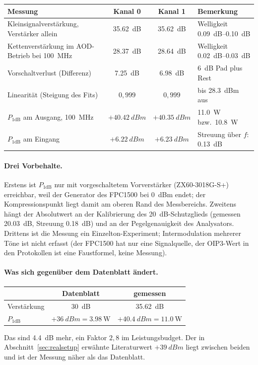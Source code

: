 \documentclass[11pt,a4paper]{article}
\begin{document}
\begin{center}
\begin{tabular}{@{}lccl@{}}
  \toprule
  Messung & Kanal 0 & Kanal 1 & Bemerkung\\
  \midrule
  Kleinsignalverstärkung, Verstärker allein
    & \SI{35.62}{\deci\bel} & \SI{35.62}{\deci\bel} & Welligkeit \SIrange{0.09}{0.10}{\deci\bel}\\
  Kettenverstärkung im AOD-Betrieb bei \SI{100}{\mega\hertz}
    & \SI{28.37}{\deci\bel} & \SI{28.64}{\deci\bel} & Welligkeit \SIrange{0.02}{0.03}{\deci\bel}\\
  Vorschaltverlust (Differenz)
    & \SI{7.25}{\deci\bel} & \SI{6.98}{\deci\bel} & \SI{6}{\deci\bel} Pad plus Rest\\
  Linearität (Steigung des Fits)
    & $0{,}999$ & $0{,}999$ & bis \SI{28.3}{dBm} aus\\
  $P_{1\mathrm{dB}}$ am Ausgang, \SI{100}{\mega\hertz}
    & $+\SI{40.42}{dBm}$ & $+\SI{40.35}{dBm}$ & \SI{11.0}{\watt} bzw.\ \SI{10.8}{\watt}\\
  $P_{1\mathrm{dB}}$ am Eingang
    & $+\SI{6.22}{dBm}$ & $+\SI{6.23}{dBm}$ & Streuung über $f$: \SI{0.13}{\deci\bel}\\
  \bottomrule
\end{tabular}
\end{center}

\paragraph{Drei Vorbehalte.}
Erstens ist $P_{1\mathrm{dB}}$ nur mit vorgeschaltetem Vorverstärker
(ZX60-3018G-S+) erreichbar, weil der Generator des FPC1500 bei \SI{0}{dBm}
endet; der Kompressionspunkt liegt damit am oberen Rand des Messbereichs.
Zweitens hängt der Absolutwert an der Kalibrierung des
\SI{20}{\deci\bel}-Schutzglieds (gemessen \SI{20.03}{\deci\bel}, Streuung
\SI{0.18}{\deci\bel}) und an der Pegelgenauigkeit des Analysators. Drittens
ist die Messung ein Einzelton-Experiment; Intermodulation mehrerer Töne ist
nicht erfasst (der FPC1500 hat nur eine Signalquelle, der OIP3-Wert in den
Protokollen ist eine Faustformel, keine Messung).

\paragraph{Was sich gegenüber dem Datenblatt ändert.}
\begin{center}
\begin{tabular}{@{}lcc@{}}
  \toprule
  & Datenblatt & gemessen\\
  \midrule
  Verstärkung & \SI{30}{\deci\bel} & \SI{35.62}{\deci\bel}\\
  $P_{1\mathrm{dB}}$ & $+\SI{36}{dBm} = \SI{3.98}{\watt}$
                     & $+\SI{40.4}{dBm} = \SI{11.0}{\watt}$\\
  \bottomrule
\end{tabular}
\end{center}
Das sind \SI{4.4}{\deci\bel} mehr, ein Faktor $2{,}8$ im Leistungsbudget. Der
in Abschnitt~\ref{sec:realsetup} erwähnte Literaturwert $+\SI{39}{dBm}$ liegt
zwischen beiden und ist der Messung näher als das Datenblatt.
\end{document}
